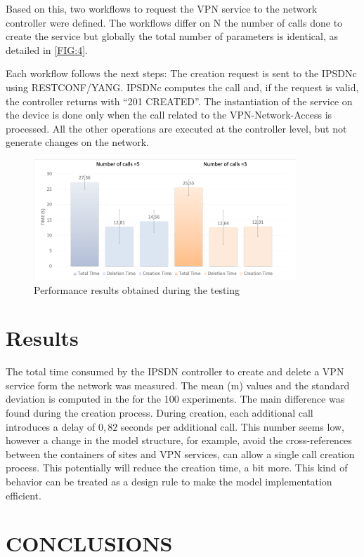 \documentclass[conference]{IEEEtran}
\begin{document}
Based on this, two workflows to request the VPN service to the network controller were defined. The workflows differ on N the number of calls done to create the service but globally the total number of parameters is identical, as detailed in \ref{FIG:4}.

Each workflow follows the next steps:  The creation request is sent to the IPSDNc using RESTCONF/YANG. IPSDNc computes the call and, if the request is valid, the controller returns with “201 CREATED”. The instantiation of the service on the device is done only when the call related to the VPN-Network-Access is processed. All the other operations are executed at the controller level, but not generate changes on the network. 

\begin{figure}
	\centering
		\includegraphics[width=\linewidth]{figure6.png}
	\caption{Performance results obtained during the testing}
	\label{FIG:5}
\end{figure}

\section{Results}
The total time consumed by the IPSDN controller to create and delete a VPN service form the network was measured. The mean (m) values and the standard deviation is computed in the for the 100 experiments. The main difference was found during the creation process. During creation, each additional call introduces a delay of $0,82$ seconds per additional call. This number seems low, however a change in the model structure, for example, avoid the cross-references between the containers of sites and VPN services, can allow a single call creation process. This potentially will reduce the creation time, a bit more. This kind of behavior can be treated as a design rule to make the model implementation efficient. 

\section{CONCLUSIONS}
\end{document}

